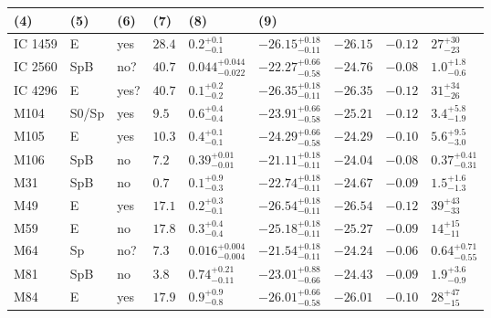 \begin{table*}
\begin{center}
\begin{tabular}{lllllllll}
\multicolumn{1}{l}{(4)} &                             
\multicolumn{1}{l}{(5)} &                             
\multicolumn{1}{l}{(6)} &                             
\multicolumn{1}{l}{(7)} &                             
\multicolumn{1}{l}{(8)} &                             
\multicolumn{1}{l}{(9)} \\                         
\hline                                                
IC 1459  &  E  &  yes   &  $28.4$  &  $0.2_{-0.1}^{+0.1}$   &  $-26.15_{-0.11}^{+0.18}$   &  $-26.15$   &  $-0.12$  &  $27_{-23}^{+30}$   \\ 
IC 2560  &  SpB  &  no?  &  $40.7$  &  $0.044_{-0.022}^{+0.044}$   &  $-22.27_{-0.58}^{+0.66}$   &  $-24.76$   &  $-0.08$  &  $1.0_{-0.6}^{+1.8}$   \\ 
IC 4296  &  E  &  yes?  &  $40.7$  &  $0.1_{-0.2}^{+0.2}$   &  $-26.35_{-0.11}^{+0.18}$   &  $-26.35$   &  $-0.12$  &  $31_{-26}^{+34}$   \\ 
M104  &  S0/Sp  &  yes   &  $9.5$  &  $0.6_{-0.4}^{+0.4}$   &  $-23.91_{-0.58}^{+0.66}$   &  $-25.21$   &  $-0.12$  &  $3.4_{-1.9}^{+5.8}$   \\ 
M105  &  E  &  yes   &  $10.3$  &  $0.4_{-0.1}^{+0.1}$   &  $-24.29_{-0.58}^{+0.66}$   &  $-24.29$   &  $-0.10$  &  $5.6_{-3.0}^{+9.5}$   \\ 
M106  &  SpB  &  no   &  $7.2$  &  $0.39_{-0.01}^{+0.01}$   &  $-21.11_{-0.11}^{+0.18}$   &  $-24.04$   &  $-0.08$  &  $0.37_{-0.31}^{+0.41}$   \\ 
M31  &  SpB  &  no   &  $0.7$  &  $0.1_{-0.3}^{+0.9}$   &  $-22.74_{-0.11}^{+0.18}$   &  $-24.67$   &  $-0.09$  &  $1.5_{-1.3}^{+1.6}$   \\ 
M49  &  E  &  yes   &  $17.1$  &  $0.2_{-0.1}^{+0.3}$   &  $-26.54_{-0.11}^{+0.18}$   &  $-26.54$   &  $-0.12$  &  $39_{-33}^{+43}$   \\ 
M59  &  E  &  no   &  $17.8$  &  $0.3_{-0.4}^{+0.4}$   &  $-25.18_{-0.11}^{+0.18}$   &  $-25.27$   &  $-0.09$  &  $14_{-11}^{+15}$   \\ 
M64  &  Sp  &  no?  &  $7.3$  &  $0.016_{-0.004}^{+0.004}$   &  $-21.54_{-0.11}^{+0.18}$   &  $-24.24$   &  $-0.06$  &  $0.64_{-0.55}^{+0.71}$   \\ 
M81  &  SpB  &  no   &  $3.8$  &  $0.74_{-0.11}^{+0.21}$   &  $-23.01_{-0.66}^{+0.88}$   &  $-24.43$   &  $-0.09$  &  $1.9_{-0.9}^{+3.6}$   \\ 
M84  &  E  &  yes   &  $17.9$  &  $0.9_{-0.8}^{+0.9}$   &  $-26.01_{-0.58}^{+0.66}$   &  $-26.01$   &  $-0.10$  &  $28_{-15}^{+47}$   \\ 

\end{tabular}
\end{center}
\end{table*}
